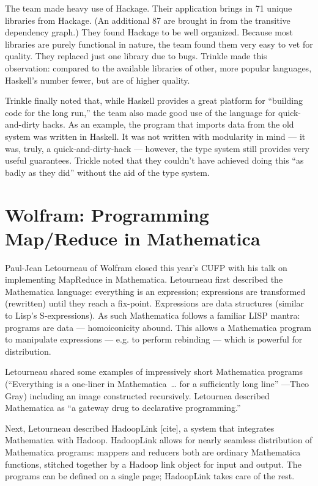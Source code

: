 \documentclass{jfp1}
\newcommand\needcite{{\color{red} [cite]}\xspace}
\begin{document}
The team made heavy use of Hackage. Their application brings in 
71 unique libraries from Hackage. (An additional 87 are brought in
from the transitive dependency graph.) They found Hackage to be 
well organized. Because most libraries are purely functional in nature,
the team found them very easy to vet for quality. They replaced just
one library due to bugs. Trinkle made this observation: compared to 
the available libraries of other, more popular languages, Haskell's 
number fewer, but are of higher quality.

Trinkle finally noted that, while Haskell provides a great platform
for ``building code for the long run,'' the team also made good use of
the language for quick-and-dirty hacks. As an example, the program
that imports data from the old system was written in Haskell. It was
not written with modularity in mind --- it was, truly, a
quick-and-dirty-hack --- however, the type system still provides very
useful guarantees. Trickle noted that they couldn't have achieved
doing this ``as badly as they did'' without the aid of the type
system.

\section{Wolfram: Programming Map/Reduce in Mathematica}


Paul-Jean Letourneau of Wolfram closed this year's CUFP with his talk
on implementing MapReduce in Mathematica. Letourneau first described
the Mathematica language: everything is an expression; expressions are
transformed (rewritten) until they reach a fix-point. Expressions are
data structures (similar to Lisp's S-expressions).  As such Mathematica
follows a familiar LISP mantra: programs are data --- homoiconicity
abound. This allows a Mathematica program to manipulate expressions
--- e.g. to perform rebinding --- which is powerful for distribution.

Letourneau shared some examples of impressively short Mathematica
programs (``Everything is a one-liner in Mathematica~\ldots{} for a sufficiently
long line'' ---Theo Gray) including an image constructed recursively. 
Letournea described Mathematica as ``a gateway drug to declarative
programming.''

Next, Letourneau described HadoopLink\needcite, a system that integrates
Mathematica with Hadoop. HadoopLink allows for nearly seamless 
distribution of Mathematica programs: mappers and reducers both
are ordinary Mathematica functions, stitched together by a Hadoop
link object for input and output. The programs can be defined on a single
page; HadoopLink takes care of the rest.
\end{document}
